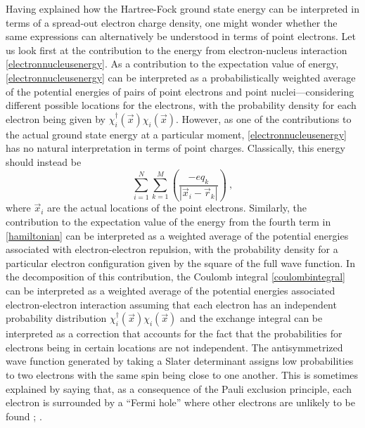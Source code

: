 \documentclass[onecolumn,secnumarabic,amsmath,amssymb,balancelastpage,nofootinbib]{article}
\begin{document}
Having explained how the Hartree-Fock ground state energy can be interpreted in terms of a spread-out electron charge density, one might wonder whether the same expressions can alternatively be understood in terms of point electrons.  Let us look first at the contribution to the energy from electron-nucleus interaction \eqref{electronnucleusenergy}.  As a contribution to the expectation value of energy, \eqref{electronnucleusenergy} can be interpreted as a probabilistically weighted average of the potential energies of pairs of point electrons and point nuclei---considering different possible locations for the electrons, with the probability density for each electron being given by $\chi_i^{\dagger}(\vec{x})\chi_i(\vec{x})$.  However, as one of the contributions to the actual ground state energy at a particular moment, \eqref{electronnucleusenergy} has no natural interpretation in terms of point charges.  Classically, this energy should instead be
\begin{equation}
\sum_{i=1}^{N}\sum_{k=1}^{M}\left(\frac{-e q_k}{|\vec{x}_i-\vec{r}_k|}\right)
\ ,
\label{pointelectronnucleusenergy}
\end{equation}
where $\vec{x}_i$ are the actual locations of the point electrons.  Similarly, the contribution to the expectation value of the energy from the fourth term in \eqref{hamiltonian} can be interpreted as a weighted average of the potential energies associated with electron-electron repulsion, with the probability density for a particular electron configuration given by the square of the full wave function.  In the decomposition of this contribution, the Coulomb integral \eqref{coulombintegral} can be interpreted as a weighted average of the potential energies associated electron-electron interaction assuming that each electron has an independent probability distribution $\chi_i^{\dagger}(\vec{x})\chi_i(\vec{x})$ and the exchange integral can be interpreted as a correction that accounts for the fact that the probabilities for electrons being in certain locations are not independent.  The antisymmetrized wave function generated by taking a Slater determinant assigns low probabilities to two electrons with the same spin being close to one another.  This is sometimes explained by saying that, as a consequence of the Pauli exclusion principle, each electron is surrounded by a ``Fermi hole'' where other electrons are unlikely to be found \cite[pg.\ 218]{lowdin1958}; \cite[sec.\ 17.2]{slatervol2}.
\end{document}
